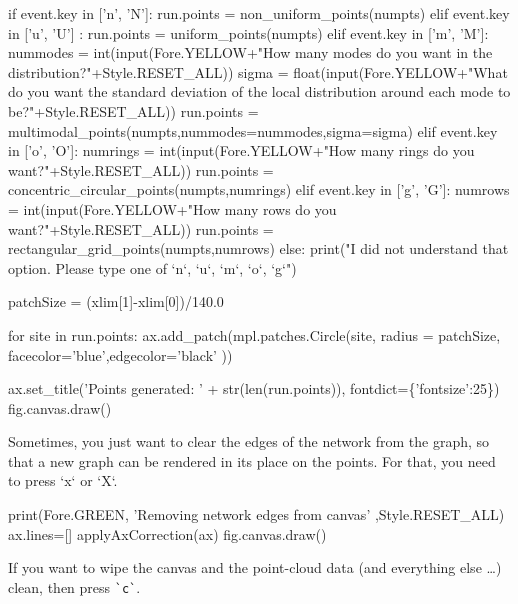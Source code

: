 if event.key in ['n', 'N']: 
        run.points = non_uniform_points(numpts)
elif event.key in ['u', 'U'] : 
        run.points = uniform_points(numpts)
elif event.key in ['m', 'M']:
        nummodes   = int(input(Fore.YELLOW+"How many modes do you want in the distribution?"+Style.RESET_ALL))
        sigma      = float(input(Fore.YELLOW+"What do you want the standard deviation of the local distribution around each mode to be?"+Style.RESET_ALL))
        run.points = multimodal_points(numpts,nummodes=nummodes,sigma=sigma)
elif event.key in ['o', 'O']:
        numrings   = int(input(Fore.YELLOW+"How many rings do you want?"+Style.RESET_ALL))
        run.points = concentric_circular_points(numpts,numrings)
elif event.key in ['g', 'G']:
        numrows    = int(input(Fore.YELLOW+"How many rows do you want?"+Style.RESET_ALL))
        run.points = rectangular_grid_points(numpts,numrows)
else:
       print("I did not understand that option. Please type one of `n`, `u`, `m`, `o`, `g`")

patchSize  = (xlim[1]-xlim[0])/140.0

for site in run.points:      
    ax.add_patch(mpl.patches.Circle(site, radius = patchSize, \\
                 facecolor='blue',edgecolor='black' ))

ax.set_title('Points generated: ' + str(len(run.points)), fontdict=\{'fontsize':25\})
fig.canvas.draw()
\nwendcode{}\nwdocspar



Sometimes, you just want to clear the edges of the network from the graph, so that
a new graph can be rendered in its place on the points. For that, you need to press
`x` or `X`. 

\nwenddocs{}\endmoddef\nwstartdeflinemarkup{}\nwenddeflinemarkup
print(Fore.GREEN, 'Removing network edges from canvas' ,Style.RESET_ALL)
ax.lines=[]
applyAxCorrection(ax)
fig.canvas.draw()
\nwendcode{}\nwdocspar

If you want to wipe the canvas and the point-cloud data (and everything else \ldots) clean, 
then press \verb|`c`|. 

